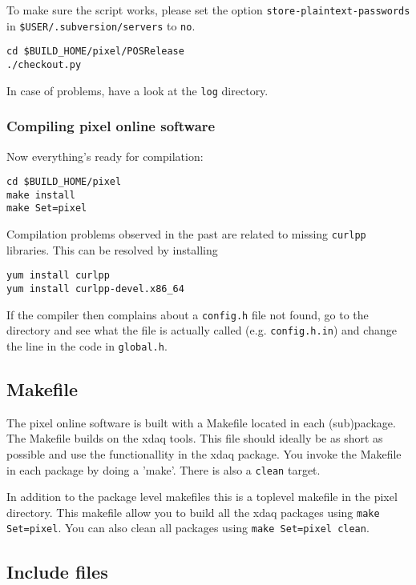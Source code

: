 To make sure the script works, please set the option 
{\tt store-plaintext-passwords} in {\tt \$USER/.subversion/servers} 
to {\tt no}.

\begin{verbatim}
cd $BUILD_HOME/pixel/POSRelease
./checkout.py
\end{verbatim}

In case of problems, have a look at the {\tt log} directory.

\subsubsection{Compiling pixel online software}
Now everything's ready for compilation:

\begin{verbatim}
cd $BUILD_HOME/pixel
make install
make Set=pixel
\end{verbatim}

Compilation problems observed in the past are related to missing 
{\tt curlpp} libraries.  This can be resolved by installing

\begin{verbatim}
yum install curlpp
yum install curlpp-devel.x86_64
\end{verbatim}

If the compiler then complains about a {\tt config.h} file not 
found, go to the directory and see what the file is actually called 
(e.g. {\tt config.h.in}) and change the line in the code in 
{\tt global.h}.

\subsection{Makefile}

The pixel online software is built with a
Makefile located in each (sub)package. The
Makefile builds on the xdaq tools. This
file should ideally be as short as possible
and use the functionallity in the xdaq package.
You invoke the Makefile in each package by 
doing a 'make'. There is also a {\tt clean} target.

In addition to the package level makefiles 
this is a toplevel makefile in the pixel
directory. This makefile allow you to build 
all the xdaq packages using {\tt make Set=pixel}.
You can also clean all packages using 
{\tt make Set=pixel clean}.

\subsection{Include files}


